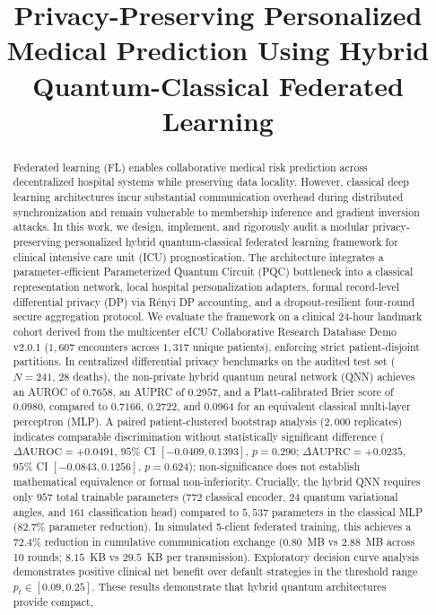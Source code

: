 \documentclass[conference]{IEEEtran}
\begin{document}
\title{Privacy-Preserving Personalized Medical Prediction Using Hybrid Quantum-Classical Federated Learning}

\author{
}

\maketitle

\begin{abstract}
Federated learning (FL) enables collaborative medical risk prediction across decentralized hospital systems while preserving data locality. However, classical deep learning architectures incur substantial communication overhead during distributed synchronization and remain vulnerable to membership inference and gradient inversion attacks. In this work, we design, implement, and rigorously audit a modular privacy-preserving personalized hybrid quantum-classical federated learning framework for clinical intensive care unit (ICU) prognostication. The architecture integrates a parameter-efficient Parameterized Quantum Circuit (PQC) bottleneck into a classical representation network, local hospital personalization adapters, formal record-level differential privacy (DP) via Rényi DP accounting, and a dropout-resilient four-round secure aggregation protocol. We evaluate the framework on a clinical 24-hour landmark cohort derived from the multicenter eICU Collaborative Research Database Demo v2.0.1 ($1,607$ encounters across $1,317$ unique patients), enforcing strict patient-disjoint partitions. In centralized differential privacy benchmarks on the audited test set ($N=241$, $28$ deaths), the non-private hybrid quantum neural network (QNN) achieves an AUROC of $0.7658$, an AUPRC of $0.2957$, and a Platt-calibrated Brier score of $0.0980$, compared to $0.7166$, $0.2722$, and $0.0964$ for an equivalent classical multi-layer perceptron (MLP). A paired patient-clustered bootstrap analysis ($2,000$ replicates) indicates comparable discrimination without statistically significant difference ($\Delta\text{AUROC} = +0.0491$, $95\%$ CI $[-0.0409, 0.1393]$, $p=0.290$; $\Delta\text{AUPRC} = +0.0235$, $95\%$ CI $[-0.0843, 0.1256]$, $p=0.624$); non-significance does not establish mathematical equivalence or formal non-inferiority. Crucially, the hybrid QNN requires only $957$ total trainable parameters ($772$ classical encoder, $24$ quantum variational angles, and $161$ classification head) compared to $5,537$ parameters in the classical MLP ($82.7\%$ parameter reduction). In simulated 5-client federated training, this achieves a $72.4\%$ reduction in cumulative communication exchange ($0.80$~MB vs $2.88$~MB across 10 rounds; $8.15$~KB vs $29.5$~KB per transmission). Exploratory decision curve analysis demonstrates positive clinical net benefit over default strategies in the threshold range $p_t \in [0.09, 0.25]$. These results demonstrate that hybrid quantum architectures provide compact, 
\end{abstract}
\end{document}
